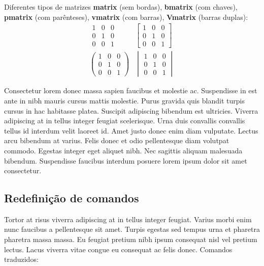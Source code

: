 \documentclass[12pt]{article}
\begin{document}
 				Diferentes tipos de matrizes \textbf{matrix} (sem bordas), \textbf{bmatrix} (com chaves), \textbf{pmatrix} (com parênteses), \textbf{vmatrix} (com barras), \textbf{Vmatrix} (barras duplas):
 				\begin{equation*}
 					\begin{array}{cc}
	 					\begin{matrix}
		 					1 & 0 & 0 \\ 
		 					0 & 1 & 0 \\ 
		 					0 & 0 & 1
	 					\end{matrix} &  
	 					\begin{bmatrix}
		 					1 & 0 & 0 \\ 
		 					0 & 1 & 0 \\ 
		 					0 & 0 & 1
	 					\end{bmatrix} \\ 
	 					
	 					\begin{pmatrix}
		 					1 & 0 & 0 \\ 
		 					0 & 1 & 0 \\ 
		 					0 & 0 & 1
	 					\end{pmatrix} & 
	 					\begin{vmatrix}
		 					1 & 0 & 0 \\ 
		 					0 & 1 & 0 \\ 
		 					0 & 0 & 1
	 					\end{vmatrix} 
 					\end{array} 
 				\end{equation*} 
 				
 				
 				
				Consectetur lorem donec massa sapien faucibus et molestie ac. Suspendisse in est ante in nibh mauris cursus mattis molestie. Purus gravida quis blandit turpis cursus in hac habitasse platea. Suscipit adipiscing bibendum est ultricies. Viverra adipiscing at in tellus integer feugiat scelerisque. Urna duis convallis convallis tellus id interdum velit laoreet id. Amet justo donec enim diam vulputate. Lectus arcu bibendum at varius. Felis donec et odio pellentesque diam volutpat commodo. Egestas integer eget aliquet nibh. Nec sagittis aliquam malesuada bibendum. Suspendisse faucibus interdum posuere lorem ipsum dolor sit amet consectetur.
			\subsection{Redefinição de comandos}
				Tortor at risus viverra adipiscing at in tellus integer feugiat. Varius morbi enim nunc faucibus a pellentesque sit amet. Turpis egestas sed tempus urna et pharetra pharetra massa massa. Eu feugiat pretium nibh ipsum consequat nisl vel pretium lectus. Lacus viverra vitae congue eu consequat ac felis donec. 
				Comandos traduzidos:
				
\end{document}
